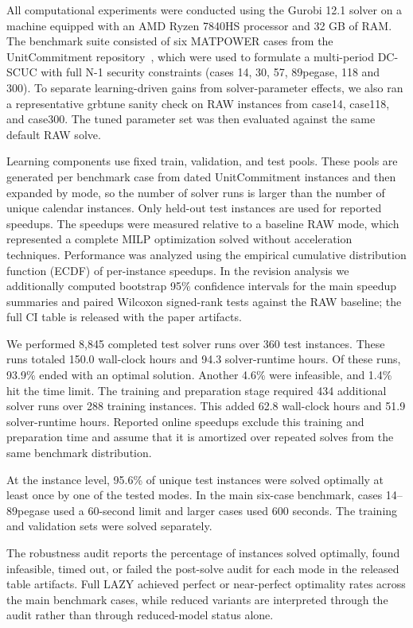 \documentclass[runningheads]{llncs}
\begin{document}
All computational experiments were conducted using the Gurobi 12.1 solver on a machine equipped with an AMD Ryzen 7840HS processor and 32 GB of RAM. The benchmark suite consisted of six MATPOWER cases from the UnitCommitment repository~\cite{Xavier2024,MATPOWER,PEGASE}, which were used to formulate a multi-period DC-SCUC with full N-1 security constraints (cases 14, 30, 57, 89pegase, 118 and 300). To separate learning-driven gains from solver-parameter effects, we also ran a representative grbtune sanity check on RAW instances from case14, case118, and case300. The tuned parameter set was then evaluated against the same default RAW solve.

Learning components use fixed train, validation, and test pools. These pools are generated per benchmark case from dated UnitCommitment instances and then expanded by mode, so the number of solver runs is larger than the number of unique calendar instances. Only held-out test instances are used for reported speedups. The speedups were measured relative to a baseline RAW mode, which represented a complete MILP optimization solved without acceleration techniques. Performance was analyzed using the empirical cumulative distribution function (ECDF) of per-instance speedups. In the revision analysis we additionally computed bootstrap 95\% confidence intervals for the main speedup summaries and paired Wilcoxon signed-rank tests against the RAW baseline; the full CI table is released with the paper artifacts.


We performed 8,845 completed test solver runs over 360 test instances. These runs totaled 150.0 wall-clock hours and 94.3 solver-runtime hours. Of these runs, 93.9\% ended with an optimal solution. Another 4.6\% were infeasible, and 1.4\% hit the time limit. The training and preparation stage required 434 additional solver runs over 288 training instances. This added 62.8 wall-clock hours and 51.9 solver-runtime hours. Reported online speedups exclude this training and preparation time and assume that it is amortized over repeated solves from the same benchmark distribution.

At the instance level, 95.6\% of unique test instances were solved optimally at least once by one of the tested modes. In the main six-case benchmark, cases 14--89pegase used a 60-second limit and larger cases used 600 seconds. The training and validation sets were solved separately.


The robustness audit reports the percentage of instances solved optimally, found infeasible, timed out, or failed the post-solve audit for each mode in the released table artifacts. Full LAZY achieved perfect or near-perfect optimality rates across the main benchmark cases, while reduced variants are interpreted through the audit rather than through reduced-model status alone.
\end{document}
